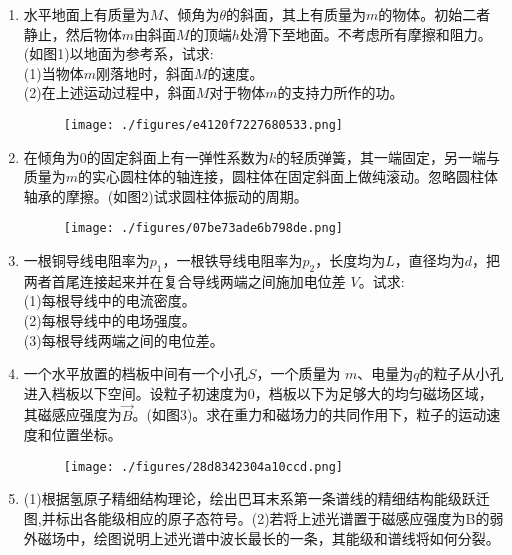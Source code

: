 
\begin{enumerate}
\item 水平地面上有质量为$M$、倾角为$\theta$的斜面，其上有质量为$m$的物体。初始二者静止，然后物体$m$由斜面$M$的顶端$h$处滑下至地面。不考虑所有摩擦和阻力。(如图1)以地面为参考系，试求:\\
(1)当物体$m$刚落地时，斜面$M$的速度。\\
(2)在上述运动过程中，斜面$M$对于物体$m$的支持力所作的功。
\begin{figure}[ht]
\centering
\texttt{[image: ./figures/e4120f7227680533.png]}
\caption{} \label{fig_SSDPEE_1}
\end{figure}
\item 在倾角为0的固定斜面上有一弹性系数为$k$的轻质弹簧，其一端固定，另一端与质量为$m$的实心圆柱体的轴连接，圆柱体在固定斜面上做纯滚动。忽略圆柱体轴承的摩擦。(如图2)试求圆柱体振动的周期。
\begin{figure}[ht]
\centering
\texttt{[image: ./figures/07be73ade6b798de.png]}
\caption{} \label{fig_SSDPEE_2}
\end{figure}
\item 一根铜导线电阻率为$p_1$，一根铁导线电阻率为$p_2$，长度均为$L$，直径均为$d$，把两者首尾连接起来并在复合导线两端之间施加电位差 $V$。试求:\\
(1)每根导线中的电流密度。\\
(2)每根导线中的电场强度。\\
(3)每根导线两端之间的电位差。
\item 一个水平放置的档板中间有一个小孔$S$，一个质量为 $m$、电量为$q$的粒子从小孔进入档板以下空间。设粒子初速度为0，档板以下为足够大的均匀磁场区域，其磁感应强度为$\vec{B}$。(如图3)。求在重力和磁场力的共同作用下，粒子的运动速度和位置坐标。
\begin{figure}[ht]
\centering
\texttt{[image: ./figures/28d8342304a10ccd.png]}
\caption{} \label{fig_SSDPEE_3}
\end{figure}
\item (1)根据氢原子精细结构理论，绘出巴耳末系第一条谱线的精细结构能级跃迁图,并标出各能级相应的原子态符号。(2)若将上述光谱置于磁感应强度为B的弱外磁场中，绘图说明上述光谱中波长最长的一条，其能级和谱线将如何分裂。
\end{enumerate}